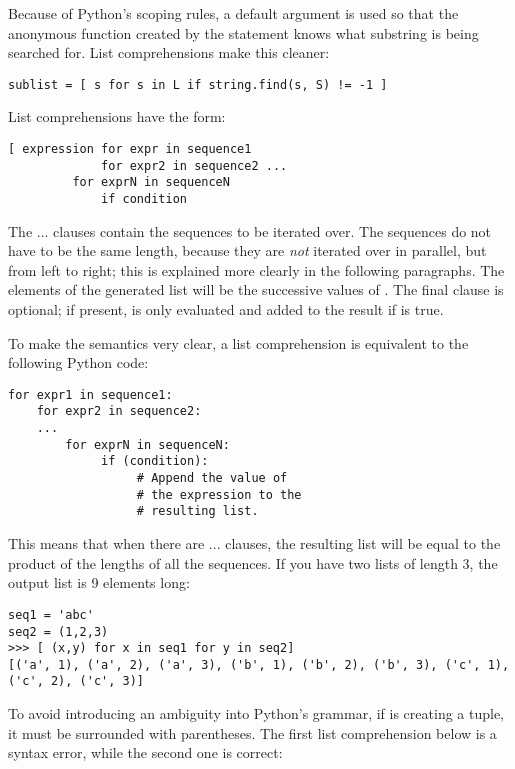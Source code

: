 \documentclass{howto}
\begin{document}
Because of Python's scoping rules, a default argument is used so that
the anonymous function created by the  statement knows
what substring is being searched for.  List comprehensions make this
cleaner:

\begin{verbatim}
sublist = [ s for s in L if string.find(s, S) != -1 ]
\end{verbatim}

List comprehensions have the form:

\begin{verbatim}
[ expression for expr in sequence1 
             for expr2 in sequence2 ...
	     for exprN in sequenceN
             if condition
\end{verbatim}

The ... clauses contain the sequences to be
iterated over.  The sequences do not have to be the same length,
because they are \emph{not} iterated over in parallel, but
from left to right; this is explained more clearly in the following
paragraphs.  The elements of the generated list will be the successive
values of .  The final  clause is
optional; if present,  is only evaluated and added to
the result if  is true.

To make the semantics very clear, a list comprehension is equivalent
to the following Python code:

\begin{verbatim}
for expr1 in sequence1:
    for expr2 in sequence2:
    ...
        for exprN in sequenceN:
             if (condition):
                  # Append the value of 
                  # the expression to the 
                  # resulting list.
\end{verbatim}

This means that when there are ... clauses,
the resulting list will be equal to the product of the lengths of all
the sequences.  If you have two lists of length 3, the output list is
9 elements long:

\begin{verbatim}
seq1 = 'abc'
seq2 = (1,2,3)
>>> [ (x,y) for x in seq1 for y in seq2]
[('a', 1), ('a', 2), ('a', 3), ('b', 1), ('b', 2), ('b', 3), ('c', 1),
('c', 2), ('c', 3)]
\end{verbatim}

To avoid introducing an ambiguity into Python's grammar, if
 is creating a tuple, it must be surrounded with
parentheses.  The first list comprehension below is a syntax error,
while the second one is correct:
\end{document}
